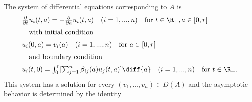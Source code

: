 \begin{example}
The system of differential equations corresponding to $A$ is
\begin{equation} \label{eq:c4-3.13}
\begin{array}{l}
\frac{\partial}{\partial t}u_i(t,a) = - \frac{\partial}{\partial a}u_i(t,a) \quad (i=1,...,n) \quad \text{for } t\in\R_+, a\in[0,r]\\[2mm]
\quad \text{with initial condition} \\[2mm]
u_i(0,a) = v_i(a) \quad (i=1,...,n) \quad \text{for } a\in[0,r] \\[2mm]
\quad \text{and boundary condition} \\[2mm]
u_i(t,0) = \int_0^r [\sum_{j=1}^n \beta_{ij}(a)u_j(t,a)]\diff{a} \quad (i=1,...,n) \quad \text{for } t\in\R_+.
\end{array}
\end{equation}
This system has a solution for every $(v_{1}, \ldots, v_{n}) \in D(A)$ and the asymptotic behavior is determined by the identity

\end{example}
